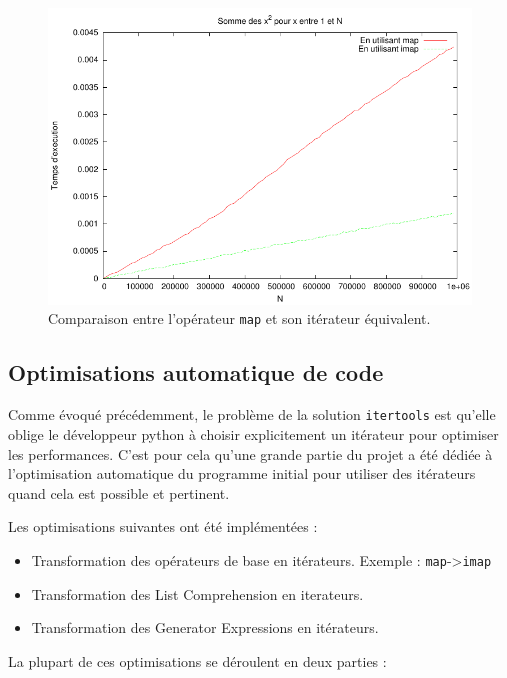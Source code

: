 \documentclass[a4paper]{article}
\begin{document}
\begin{figure}[h!]
  \includegraphics[width=\textwidth]{MapImap}
  \caption{Comparaison entre l'opérateur \texttt{map} et son itérateur équivalent.}
\end{figure}

\subsection*{Optimisations automatique de code}

Comme évoqué précédemment, le problème de la solution \texttt{itertools} est
qu'elle oblige le développeur python à choisir explicitement un
itérateur pour optimiser les performances. C'est pour cela qu'une
grande partie du projet a été dédiée à l'optimisation automatique du
programme initial pour utiliser des itérateurs quand cela est possible
et pertinent.

\vspace{.5em}

Les optimisations suivantes ont été implémentées :

\begin{itemize}
\item Transformation des opérateurs de base en itérateurs. Exemple :
  \texttt{map}->\texttt{imap}
\item Transformation des List Comprehension en iterateurs.
\item Transformation des Generator Expressions en itérateurs.
\end{itemize}

\vspace{.5em}

La plupart de ces optimisations se déroulent en deux parties :
\end{document}
